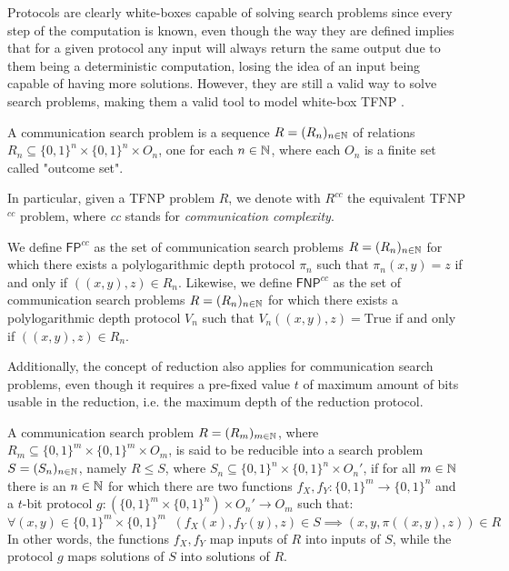 Protocols are clearly white-boxes capable of solving search problems since every step of the computation is known, even though the way they are defined implies that for a given protocol any input will always return the same output due to them being a deterministic computation, losing the idea of an input being capable of having more solutions. However, they are still a valid way to solve search problems, making them a valid tool to model white-box \textsf{TFNP} \cite{proofs_circuits_communication, tfnp_characterization}.

\begin{definition}
    A communication search problem is a sequence $R = (R_n)_{n \in \mathbb{N}}$ of relations $R_n \subseteq \{0,1\}^n \times \{0,1\}^n \times O_n$, one for each $n \in \mathbb{N}$, where each $O_n$ is a finite set called "outcome set".
\end{definition}

In particular, given a \textsf{TFNP} problem $R$, we denote with $R^{cc}$ the equivalent \textsf{TFNP}$^{cc}$ problem, where \textit{cc} stands for \textit{communication complexity}.

\begin{definition}
    We define $\mathsf{FP}^{cc}$ as the set of communication search problems $R = (R_n)_{n \in \mathbb{N}}$ for which there exists a polylogarithmic depth protocol $\pi_n$ such that $\pi_n(x,y) = z$ if and only if $((x,y), z) \in R_n$. Likewise, we define $\mathsf{FNP}^{cc}$ as the set of communication search problems $R = (R_n)_{n \in \mathbb{N}}$ for which there exists a polylogarithmic depth protocol $V_n$ such that $V_n((x,y), z) = \mathrm{True}$ if and only if $((x,y), z) \in R_n$. 
\end{definition}

Additionally, the concept of reduction also applies for communication search problems, even though it requires a pre-fixed value $t$ of maximum amount of bits usable in the reduction, i.e. the maximum depth of the reduction protocol.

\newpage

\begin{definition}
    A communication search problem $R = (R_m)_{m \in \mathbb{N}}$, where $R_m \subseteq \{0,1\}^m \times \{0,1\}^m \times O_m$, is said to be reducible into a search problem $S = (S_n)_{n \in \mathbb{N}}$, namely $R \leq S$, where $S_n \subseteq \{0,1\}^n \times \{0,1\}^n \times O_n'$, if for all $m \in \mathbb{N}$ there is an $n \in \mathbb{N}$ for which there are two functions $f_X, f_Y : \{0,1\}^m \to \{0,1\}^n$ and a $t$-bit protocol $g : (\{0,1\}^m \times \{0,1\}^n) \times O_n' \to O_m$ such that:
    \[\forall (x,y) \in \{0,1\}^m \times \{0,1\}^m \;\; (f_X(x), f_Y(y), z) \in S \implies (x, y, \pi((x,y), z)) \in R\]
    In other words, the functions $f_X,f_Y$ map inputs of $R$ into inputs of $S$, while the protocol $g$ maps solutions of $S$ into solutions of $R$. 
\end{definition}

